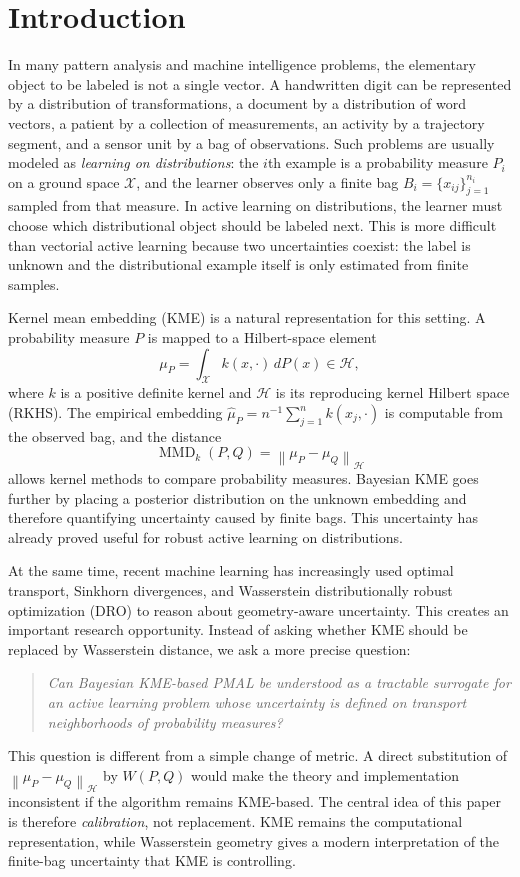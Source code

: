 \documentclass[10pt,journal]{IEEEtran}
\DeclareMathOperator{\MMD}{MMD}
\newcommand{\Xcal}{\mathcal{X}}
\newcommand{\Hcal}{\mathcal{H}}
\newcommand{\wh}{\widehat}
\newcommand{\norm}[1]{\left\lVert #1 \right\rVert}
\begin{document}
\section{Introduction}
\label{sec:introduction}

In many pattern analysis and machine intelligence problems, the elementary object to be labeled is not a single vector. A handwritten digit can be represented by a distribution of transformations, a document by a distribution of word vectors, a patient by a collection of measurements, an activity by a trajectory segment, and a sensor unit by a bag of observations. Such problems are usually modeled as \emph{learning on distributions}: the $i$th example is a probability measure $P_i$ on a ground space $\Xcal$, and the learner observes only a finite bag $B_i=\{x_{ij}\}_{j=1}^{n_i}$ sampled from that measure. In active learning on distributions, the learner must choose which distributional object should be labeled next. This is more difficult than vectorial active learning because two uncertainties coexist: the label is unknown and the distributional example itself is only estimated from finite samples.

Kernel mean embedding (KME) is a natural representation for this setting. A probability measure $P$ is mapped to a Hilbert-space element
\begin{equation}
    \mu_P = \int_{\Xcal} k(x,\cdot)\,dP(x) \in \Hcal,
\end{equation}
where $k$ is a positive definite kernel and $\Hcal$ is its reproducing kernel Hilbert space (RKHS). The empirical embedding $\wh\mu_P=n^{-1}\sum_{j=1}^{n}k(x_j,\cdot)$ is computable from the observed bag, and the distance
\begin{equation}
    \MMD_k(P,Q)=\norm{\mu_P-\mu_Q}_{\Hcal}
\end{equation}
allows kernel methods to compare probability measures. Bayesian KME goes further by placing a posterior distribution on the unknown embedding and therefore quantifying uncertainty caused by finite bags. This uncertainty has already proved useful for robust active learning on distributions.

At the same time, recent machine learning has increasingly used optimal transport, Sinkhorn divergences, and Wasserstein distributionally robust optimization (DRO) to reason about geometry-aware uncertainty. This creates an important research opportunity. Instead of asking whether KME should be replaced by Wasserstein distance, we ask a more precise question:
\begin{quote}
\emph{Can Bayesian KME-based PMAL be understood as a tractable surrogate for an active learning problem whose uncertainty is defined on transport neighborhoods of probability measures?}
\end{quote}
This question is different from a simple change of metric. A direct substitution of $\norm{\mu_P-\mu_Q}_{\Hcal}$ by $W(P,Q)$ would make the theory and implementation inconsistent if the algorithm remains KME-based. The central idea of this paper is therefore \emph{calibration}, not replacement. KME remains the computational representation, while Wasserstein geometry gives a modern interpretation of the finite-bag uncertainty that KME is controlling.
\end{document}
